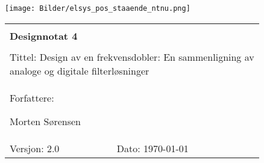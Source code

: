\topmargin -1.5cm
\begin{minipage}[c]{0.15\textwidth}
\texttt{[image: Bilder/elsys\_pos\_staaende\_ntnu.png]}  
\end{minipage}
\begin{minipage}[c]{0.85\textwidth}

\renewcommand{\arraystretch}{1.7}
\large 
\begin{tabularx}{\textwidth}{|X|X|}
\hline
\multicolumn{2}{|l|}{} \\
\multicolumn{2}{|l|}{\huge \textbf{Designnotat 4}} \\
\multicolumn{2}{|l|}{}  \\
\hline
\multicolumn{2}{|l|}{\parbox[c][1.4cm]{0.9\textwidth}{Tittel: 
Design av en frekvensdobler: En sammenligning av\\ analoge og digitale filterløsninger
}} \\
\hline
\multicolumn{2}{|l|}{Forfattere: 

Morten Sørensen
} \\
\hline

Versjon: 2.0 & Dato: \today
\\
\hline 
\end{tabularx}
\end{minipage}
\normalsize

